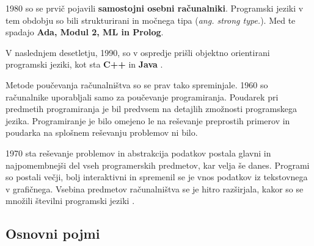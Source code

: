 1980 so se prvič pojavili \textbf{samostojni osebni računalniki}. Programski
jeziki v tem obdobju so bili strukturirani in močnega tipa (\emph{ang.  strong type.}). Med te spadajo \textbf{Ada, Modul 2, ML in Prolog}.

V naslednjem desetletju, 1990, so v ospredje prišli objektno
orientirani programski jeziki, kot sta \textbf{C++} in \textbf{Java}
\cite{thesisAWebP}.



Metode poučevanja računalništva so se prav tako spreminjale. 1960 so
računalnike uporabljali samo za poučevanje programiranja. Poudarek pri
predmetih programiranja je bil predvsem na detajlih zmožnosti
programskega jezika. Programiranje je bilo omejeno le na reševanje
preprostih primerov in poudarka na splošnem reševanju problemov ni
bilo.

1970 sta reševanje problemov in abstrakcija podatkov postala glavni
in najpomembnejši del vseh programerskih predmetov, kar velja še
danes. Programi so postali večji, bolj interaktivni in spremenil se
je vnos podatkov iz tekstovnega v grafičnega. Vsebina predmetov
računalništva se je hitro razširjala, kakor so se množili številni
programski jeziki \cite{thesisAWebP}.




 
\subsection{Osnovni pojmi}
\label{sec:kaj_je_programiranje}


